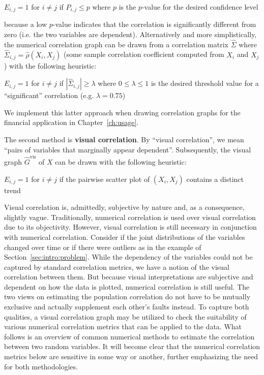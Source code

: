 \begin{algorithm}
	$E_{i,j} = 1$ for $i\neq j$ if $P_{i,j} \leq p$ where $p$ is the $p$-value 
	for the desired confidence level
\end{algorithm}

\noindent because a low $p$-value indicates that the correlation is 
significantly different from zero (i.e. the two variables are dependent). 
Alternatively and more simplistically, the numerical correlation graph can be 
drawn from a correlation matrix $\hat{\Sigma}$ where 
$\hat{\Sigma}_{i,j}=\hat{\rho}(X_i,X_j)$ (some sample correlation coefficient 
computed from $X_i$ and $X_j$) with the following heuristic:\\

\begin{algorithm}
	$E_{i,j} = 1$ for $i\neq j$ if $|\hat{\Sigma}_{i,j}| \geq \lambda$ where 
	$0 \leq \lambda \leq 1$ is the desired threshold value for a 
	``significant'' correlation (e.g. $\lambda = 0.75$)
\end{algorithm}

\noindent We implement this latter approach when drawing correlation 
graphs for the financial application in Chapter~\ref{ch:usage}.

The second method is \textbf{visual correlation}. By ``visual correlation'', we 
mean ``pairs of variables that marginally appear dependent''. 
Subsequently, the visual graph $\hat{G}^{\text{vis}}$ of $X$ can be drawn with 
the following heuristic:\\

\begin{algorithm}
	$E_{i,j} = 1$ for $i\neq j$ if the pairwise scatter plot of $(X_i, X_j)$ 
	contains a distinct trend
\end{algorithm}

Visual correlation is, admittedly, subjective by nature 
and, as a consequence, slightly vague. Traditionally, 
numerical correlation is used over visual correlation due to its objectivity. 
However, visual correlation is still necessary in conjunction with 
numerical correlation. Consider if the joint distributions of the variables 
changed over time or if there were outliers as in the example of 
Section~\ref{sec:intro:problem}. While the dependency of the variables could 
not be captured by standard correlation metrics, we have a notion of the visual 
correlation between them. But because visual interpretations are subjective and 
dependent on how the data is plotted, numerical correlation is still useful. 
The two views on estimating the population correlation do not have to be 
mutually exclusive and actually supplement each other's faults instead.
To capture both qualities, a visual correlation graph may be utilized to check 
the suitability of various numerical correlation metrics that can be applied to 
the data.
What follows is an overview of common numerical methods 
to estimate the correlation between two random variables. It will become clear 
that the numerical correlation metrics below are sensitive in some way or 
another, further emphasizing the need for both methodologies.

